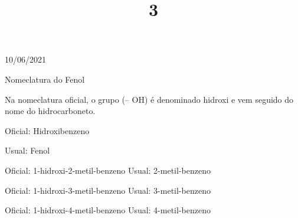 \documentclass{SchoolBook}
\begin{document}
\begin{day}{10/06/2021}
        \title{3}{Nomeclatura do Fenol}
        
        Na nomeclatura oficial, o grupo (-- OH) é denominado hidroxi e vem seguido do nome do hidrocarboneto.
        
         Oficial: Hidroxibenzeno
        
         Usual: Fenol
        
        Oficial: 1-hidroxi-2-metil-benzeno
        Usual: 2-metil-benzeno
        
        Oficial: 1-hidroxi-3-metil-benzeno
        Usual: 3-metil-benzeno
        
        Oficial: 1-hidroxi-4-metil-benzeno
        Usual: 4-metil-benzeno
    \end{day}
    
\end{document}
